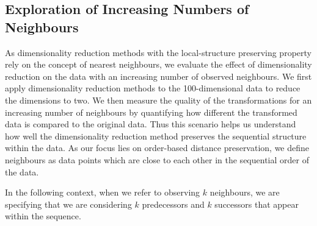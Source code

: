 \documentclass[pdftex,12pt,a4paper]{report}
\begin{document}
\subsection{Exploration of Increasing Numbers of Neighbours} \label{subsec:increasing-neighb-synthetic}
As dimensionality reduction methods with the local-structure preserving property rely on the concept of nearest neighbours, we evaluate the effect of dimensionality reduction on the data with an increasing number of observed neighbours.
We first apply dimensionality reduction methods to the 100-dimensional data to reduce the dimensions to two.
We then measure the quality of the transformations for an increasing number of neighbours by quantifying how different the transformed data is compared to the original data.
Thus this scenario helps us understand how well the dimensionality reduction method preserves the sequential structure within the data.
As our focus lies on order-based distance preservation, we define neighbours as data points which are close to each other in the sequential order of the data.

In the following context, when we refer to observing $k$ neighbours, we are specifying that we are considering $k$ predecessors and $k$ successors that appear within the sequence.
\end{document}
